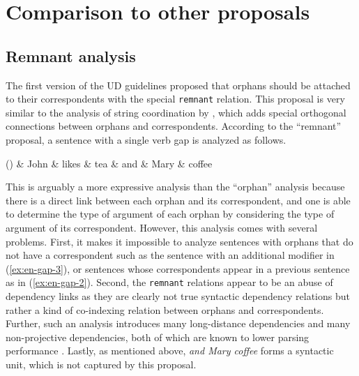 \documentclass[11pt]{article}
\newenvironment{myquote}%
  {\list{}{\leftmargin=0.0in\rightmargin=0.0in}\item[]}%
  {\endlist}
\newcounter{excounter}
\begin{document}
\section{Comparison to other proposals}
\label{sec:comparison}

\subsection{Remnant analysis}

The first version of the UD guidelines \cite{Nivre2016} proposed that orphans should be attached to their correspondents with the special \texttt{remnant} relation. This proposal is very similar to the analysis of string coordination by , which adds special orthogonal connections between orphans and correspondents. According to the ``remnant'' proposal, a sentence with a single verb gap is analyzed as follows.
\begin{myquote}
\label{ex:en-remnant}
\footnotesize
  \begin{dependency}[edge unit distance=2.5ex]
    \begin{deptext}[column sep=0.3cm]
      (\theexcounter) \& John \& likes \& tea \& and \& Mary \& coffee \\
    \end{deptext}
  \end{dependency}
\end{myquote}
This is arguably a more expressive analysis than the ``orphan'' analysis because there is a direct link between each orphan and its correspondent, and one is able to determine the type of argument of each orphan by considering the type of argument of its correspondent. However, this analysis comes with several problems. First, it makes it impossible to analyze sentences with orphans that do not have a correspondent such as the sentence with an additional modifier in (\ref{ex:en-gap-3}), or sentences whose correspondents appear in a previous sentence as in (\ref{ex:en-gap-2}). Second, the \texttt{remnant} relations appear to be an abuse of dependency links as they are clearly not true syntactic dependency relations but rather a kind of co-indexing relation between orphans and correspondents. Further, such an analysis introduces many long-distance dependencies and many non-projective dependencies, both of which are known to lower parsing performance \cite{McDonald2007}. Lastly, as mentioned above, \textit{and Mary coffee} forms a syntactic unit, which is not captured by this proposal.
\end{document}
